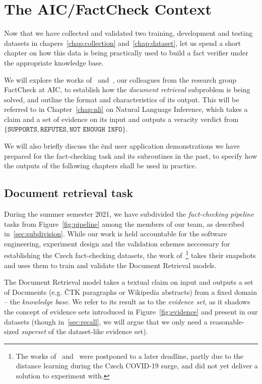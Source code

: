 \chapter{The AIC/FactCheck Context}
\label{chap:pipeline}
Now that we have collected and validated two training, development and testing datasets in chapers~\ref{chap:collection} and~\ref{chap:dataset}, let us spend a short chapter on how this data is being practically used to build a fact verifier under the appropriate knowledge base.

We will explore the works of~\cite{gazo,dedkova} and~\cite{rypar}, our colleagues from the research group \textsf{FactCheck} at \textsf{AIC}, to establish how the \textit{document retrieval} subproblem is being solved, and outline the format and characteristics of its output. This will be referred to in Chapter~\ref{chap:nli} on Natural Language Inference, which takes a claim and a set of evidence on its input and outputs a veracity verdict from $\{\texttt{SUPPORTS},\texttt{REFUTES},\texttt{NOT ENOUGH INFO}\}$.

We will also briefly discuss the \"{end user} application demonstrations we have prepared for the fact-checking task and its subroutines in the past, to specify how the outputs of the following chapters shall be used in practice.

\section{Document retrieval task}
\label{sec:document-retrieval}
During the summer semester 2021, we have subdivided the \textit{fact-checking pipeline} tasks from Figure~\ref{fig:pipeline} among the members of our team, as described in~\ref{sec:subdivision}. While our work is held accountable for the software engineering, experiment design and the validation schemes neccessary for establishing the Czech fact-checking datasets, the work of~\cite{rypar}\footnote{The works of~\cite{gazo} and~\cite{dedkova} were postponed to a later deadline, partly due to the distance learning during the Czech COVID-19 surge, and did not yet deliver a solution to experiment with.} takes their snapshots and uses them to train and validate the Document Retrieval models.

The Document Retrieval model takes a textual claim on input and outputs a set of Documents (e.g. \textsf{ČTK} paragraphs or \textsf{Wikipedia} abstracts) from a fixed domain -- the \textit{knowledge base}. We refer to its result as to the \textit{evidence set}, as it shadows the concept of evidence sets introduced in Figure~\ref{fig:evidence} and present in our datasets (though in~\ref{sec:recall}, we will argue that we only need a reasonable-sized \textit{superset} of the dataset-like evidence set).


